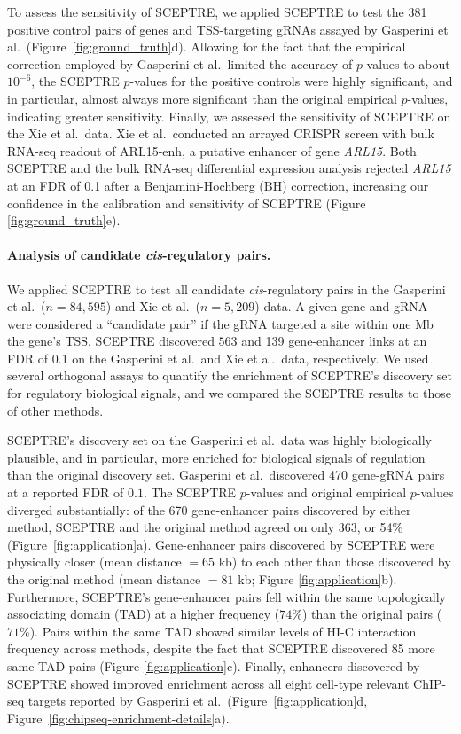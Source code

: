 \documentclass{article}
\begin{document}
To assess the sensitivity of SCEPTRE, we applied SCEPTRE to test the 381 positive control pairs of genes and TSS-targeting gRNAs assayed by Gasperini et al.\ (Figure~\ref{fig:ground_truth}d). Allowing for the fact that the empirical correction employed by Gasperini et al.\ limited the accuracy of $p$-values to about $10^{-6}$, the SCEPTRE $p$-values for the positive controls were highly significant, and in particular, almost always more significant than the original empirical $p$-values, indicating greater sensitivity. Finally, we assessed the sensitivity of SCEPTRE on the Xie et al.\ data. Xie et al.\ conducted an arrayed CRISPR screen with bulk RNA-seq readout of ARL15-enh, a putative enhancer of gene \textit{ARL15}. Both SCEPTRE and the bulk RNA-seq differential expression analysis rejected \textit{ARL15} at an FDR of 0.1 after a Benjamini-Hochberg (BH) correction, increasing our confidence in the calibration and sensitivity of SCEPTRE (Figure \ref{fig:ground_truth}e).

\paragraph{Analysis of candidate \textit{cis}-regulatory pairs.}

We applied SCEPTRE to test all candidate \textit{cis}-regulatory pairs in the Gasperini et al.\ ($n=84,595$) and Xie et al.\ ($n=5,209$) data. A given gene and gRNA were considered a ``candidate pair'' if the gRNA targeted a site within one Mb the gene's TSS. SCEPTRE discovered $563$ and 139 gene-enhancer links at an FDR of 0.1 on the Gasperini et al.\ and Xie et al.\ data, respectively. We used several orthogonal assays to quantify the enrichment of SCEPTRE's discovery set for regulatory biological signals, and we compared the SCEPTRE results to those of other methods.

SCEPTRE's discovery set on the Gasperini et al.\ data was highly biologically plausible, and in particular, more enriched for biological signals of regulation than the original discovery set. Gasperini et al.\ discovered 470 gene-gRNA pairs at a reported FDR of $0.1$. The SCEPTRE $p$-values and original empirical $p$-values diverged substantially: of the 670 gene-enhancer pairs discovered by either method, SCEPTRE and the original method agreed on only 363, or 54\% (Figure~\ref{fig:application}a). Gene-enhancer pairs discovered by SCEPTRE were physically closer (mean distance $=65$ kb) to each other than those discovered by the original method (mean distance $=81$ kb; Figure \ref{fig:application}b). Furthermore, SCEPTRE's gene-enhancer pairs fell within the same topologically associating domain (TAD) at a higher frequency ($74\%$) than the original pairs ($71\%$). Pairs within the same TAD showed similar levels of HI-C interaction frequency across methods, despite the fact that SCEPTRE discovered 85 more same-TAD pairs (Figure \ref{fig:application}c). Finally, enhancers discovered by SCEPTRE showed improved enrichment across all eight cell-type relevant ChIP-seq targets reported by Gasperini et al.\ (Figure~\ref{fig:application}d, Figure~\ref{fig:chipseq-enrichment-details}a).
\end{document}
